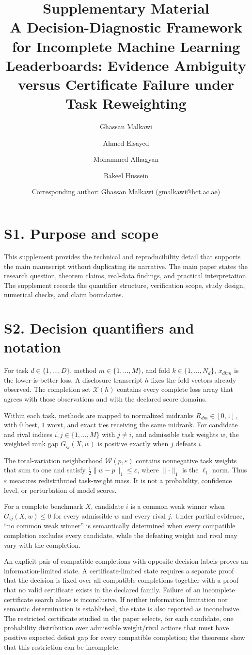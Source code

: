\documentclass[11pt]{article}
\title{Supplementary Material\\A Decision-Diagnostic Framework for Incomplete Machine Learning Leaderboards: Evidence Ambiguity versus Certificate Failure under Task Reweighting}
\author{Ghassan Malkawi \and Ahmed Elsayed \and Mohammed Alhagyan \and Bakeel Hussein}
\date{Corresponding author: Ghassan Malkawi (gmalkawi@hct.ac.ae)}
\begin{document}
\maketitle

\section*{S1. Purpose and scope}
This supplement provides the technical and reproducibility detail that supports the main manuscript without duplicating its narrative. The main paper states the research question, theorem claims, real-data findings, and practical interpretation. The supplement records the quantifier structure, verification scope, study design, numerical checks, and claim boundaries.

\section*{S2. Decision quantifiers and notation}
For task $d\in\{1,\ldots,D\}$, method $m\in\{1,\ldots,M\}$, and fold $k\in\{1,\ldots,N_d\}$, $x_{dkm}$ is the lower-is-better loss. A disclosure transcript $h$ fixes the fold vectors already observed. The completion set $\mathcal X(h)$ contains every complete loss array that agrees with those observations and with the declared score domains.

Within each task, methods are mapped to normalized midranks $R_{dm}\in[0,1]$, with $0$ best, $1$ worst, and exact ties receiving the same midrank. For candidate and rival indices $i,j\in\{1,\ldots,M\}$ with $j\neq i$, and admissible task weights $w$, the weighted rank gap $G_{ij}(X,w)$ is positive exactly when $j$ defeats $i$.

The total-variation neighborhood $\mathcal W(p,\varepsilon)$ contains nonnegative task weights that sum to one and satisfy $\tfrac12\lVert w-p\rVert_1\le \varepsilon$, where $\lVert\cdot\rVert_1$ is the $\ell_1$ norm. Thus $\varepsilon$ measures redistributed task-weight mass. It is not a probability, confidence level, or perturbation of model scores.

For a complete benchmark $X$, candidate $i$ is a common weak winner when $G_{ij}(X,w)\le 0$ for every admissible $w$ and every rival $j$. Under partial evidence, ``no common weak winner'' is semantically determined when every compatible completion excludes every candidate, while the defeating weight and rival may vary with the completion.

An explicit pair of compatible completions with opposite decision labels proves an information-limited state. A certificate-limited state requires a separate proof that the decision is fixed over all compatible completions together with a proof that no valid certificate exists in the declared family. Failure of an incomplete certificate search alone is inconclusive. If neither information limitation nor semantic determination is established, the state is also reported as inconclusive. The restricted certificate studied in the paper selects, for each candidate, one probability distribution over admissible weight/rival actions that must have positive expected defeat gap for every compatible completion; the theorems show that this restriction can be incomplete.
\end{document}
